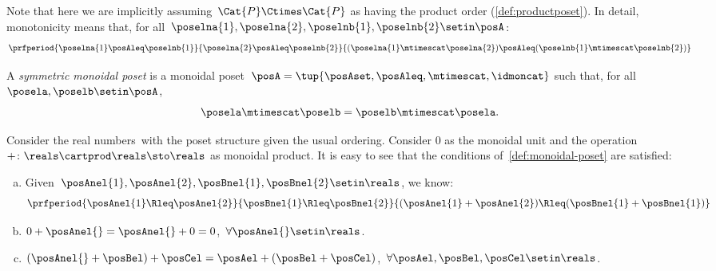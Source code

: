 Note that here we are implicitly assuming~$\Cat{P} \Ctimes \Cat{P}$ as having the product order (\cref{def:productposet}).
In detail, monotonicity means that, for all~$\poselna{1}, \poselna{2}, \poselnb{1}, \poselnb{2} \setin \posA$:
\begin{equation}
    \prfperiod{
        \poselna{1} \posAleq \poselnb{1}}{\poselna{2} \posAleq \poselnb{2}}{ (\poselna{1} \mtimescat  \poselna{2}) \posAleq  (\poselnb{1} \mtimescat  \poselnb{2})}
\end{equation}

\begin{ctdefinition}
    \label{def:sym-monoidal-poset}
    A \emph{symmetric monoidal poset} is a monoidal poset~$\posA=\tup{\posAset, \posAleq, \mtimescat, \idmoncat}$ such that, for all~$\posela, \poselb \setin \posA$,
    \begin{equation}
        \posela \mtimescat \poselb = \poselb \mtimescat \posela.
    \end{equation}
\end{ctdefinition}

\begin{example}
    \label{ex:monoidal-pos-reals}
    Consider the real numbers~\reals with the poset structure given the usual ordering.
    Consider 0 as the monoidal unit and the operation~$+\colon \reals\cartprod \reals\sto \reals$ as monoidal product.
    It is easy to see that the conditions of~\cref{def:monoidal-poset} are satisfied:
    \begin{enumerate}[(a)]
        \item Given~$\posAnel{1},\posAnel{2},\posBnel{1},\posBnel{2}\setin \reals$, we know:
              \begin{equation}
                  \prfperiod{
                      \posAnel{1}\Rleq  \posAnel{2}
                  }{
                      \posBnel{1}\Rleq  \posBnel{2}
                  }{
                      (\posAnel{1}+\posAnel{2}) \Rleq  (\posBnel{1}+\posBnel{1})
                  }
              \end{equation}
        \item $0+\posAnel{}=\posAnel{}+0=0$,~$\forall \posAnel{}\setin \reals$.
        \item $(\posAnel{}+\posBel)+\posCel=\posAel+(\posBel+\posCel)$,~$\forall \posAel,\posBel,\posCel\setin \reals$.
    \end{enumerate}
\end{example}

